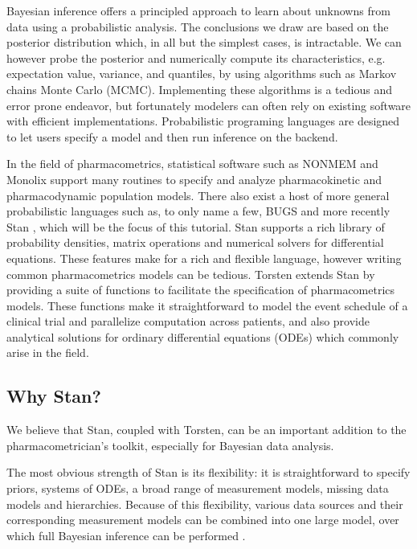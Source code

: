 
Bayesian inference offers a principled approach to learn about unknowns from data using a probabilistic analysis.
The conclusions we draw are based on the posterior distribution which, in all but the simplest cases, is intractable.
We can however probe the posterior and numerically compute its characteristics, e.g. expectation value, variance, and quantiles, by using algorithms such as Markov chains Monte Carlo (MCMC).
Implementing these algorithms is a tedious and error prone endeavor, but fortunately modelers can often rely on existing software with efficient implementations.
Probabilistic programing languages are designed to let users specify a model and then run inference on the backend.

In the field of pharmacometrics, statistical software such as NONMEM \cite{author:0000} and Monolix \cite{author:0000} support many routines to specify and analyze pharmacokinetic and pharmacodynamic population models.
There also exist a host of more general probabilistic languages such as, to only name a few, BUGS \cite{author:0000} and more recently Stan \cite{Carpenter:2017}, which will be the focus of this tutorial.
Stan supports a rich library of probability densities, matrix operations and numerical solvers for differential equations.
These features make for a rich and flexible language, however writing common pharmacometrics models can be tedious.
Torsten extends Stan by providing a suite of functions to facilitate the specification of pharmacometrics models.
These functions make it straightforward to model the event schedule of a clinical trial and parallelize computation across patients, and also provide analytical solutions for ordinary differential equations (ODEs) which commonly arise in the field.


\subsection{Why Stan?}

We believe that Stan, coupled with Torsten, can be an important addition to the pharmacometrician's toolkit, especially for Bayesian data analysis.

The most obvious strength of Stan is its flexibility: it is straightforward to specify priors, systems of ODEs, a broad range of measurement models, missing data models and hierarchies.
Because of this flexibility, various data sources and their corresponding measurement models can be combined into one large model, over which full Bayesian inference can be performed \cite[e.g][]{Weber:2018}.

